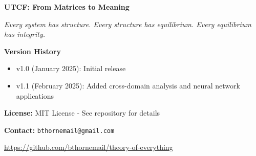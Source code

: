 \documentclass[11pt,a4paper]{article}
\theoremstyle{definition}
\theoremstyle{remark}
\begin{document}
\listofalgorithms
{}


\begin{center}
\vspace{2cm}
\textbf{UTCF: From Matrices to Meaning}

\vspace{0.5cm}
\textit{Every system has structure. Every structure has equilibrium. Every equilibrium has integrity.}

\vspace{1cm}
\textbf{Version History}
\begin{itemize}
\item v1.0 (January 2025): Initial release
\item v1.1 (February 2025): Added cross-domain analysis and neural network applications
\end{itemize}

\vspace{0.5cm}
\textbf{License:} MIT License - See repository for details

\vspace{0.5cm}
\textbf{Contact:} \texttt{bthornemail@gmail.com}

\vspace{0.5cm}
\url{https://github.com/bthornemail/theory-of-everything}
\end{center}

\printindex
\end{document}
